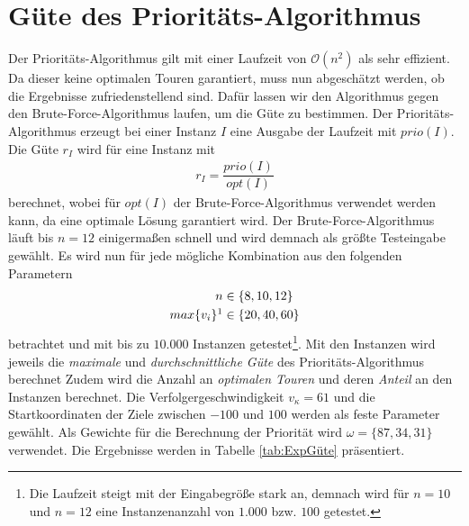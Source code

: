 \documentclass[german,version-2019-11]{uzl-thesis}
\begin{document}
\section{Güte des Prioritäts-Algorithmus}
Der Prioritäts-Algorithmus gilt mit einer Laufzeit von $\mathcal{O}(n^2)$ als sehr effizient. Da dieser keine optimalen Touren garantiert, muss nun abgeschätzt werden, ob die Ergebnisse zufriedenstellend sind. Dafür lassen wir den Algorithmus gegen den Brute-Force-Algorithmus laufen, um die Güte zu bestimmen. Der Prioritäts-Algorithmus erzeugt bei einer Instanz $I$ eine Ausgabe der Laufzeit mit $prio(I)$. Die Güte $r_I$ wird für eine Instanz mit
\begin{align*}
r_I = \dfrac{prio(I)}{opt(I)}
\end{align*} 
berechnet, wobei für $opt(I)$ der Brute-Force-Algorithmus verwendet werden kann, da eine optimale Lösung garantiert wird. Der Brute-Force-Algorithmus läuft bis $n=12$ einigermaßen schnell und wird demnach als größte Testeingabe gewählt. Es wird nun für jede mögliche Kombination aus den folgenden Parametern
\begin{align*}
n&\in\{8,10,12\}\\
max\{v_{i}\}\footnotemark&\in\{20,40,60\} 
\end{align*}
 betrachtet und mit bis zu $10.000$ Instanzen getestet\footnote{Die Laufzeit steigt mit der Eingabegröße stark an, demnach wird für $n=10$ und $n=12$ eine Instanzenanzahl von $1.000$ bzw. $100$ getestet.}. Mit den Instanzen wird jeweils die \emph{maximale} und \emph{durchschnittliche Güte} des Prioritäts-Algorithmus berechnet Zudem wird die Anzahl an \emph{optimalen Touren} und deren \emph{Anteil} an den Instanzen berechnet. Die Verfolgergeschwindigkeit $v_{\kappa}=61$ und die Startkoordinaten der Ziele zwischen $-100$ und $100$ werden als feste Parameter gewählt. Als Gewichte für die Berechnung der Priorität wird $\omega = \{87,34,31\}$ verwendet. Die Ergebnisse werden in Tabelle \ref{tab:ExpGüte} präsentiert.
\end{document}
